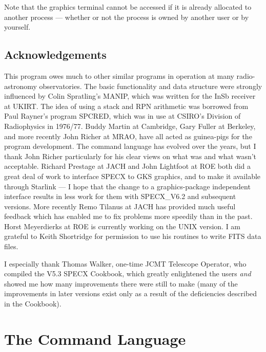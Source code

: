 \documentclass[11pt,twoside]{report}
\begin{document}
Note that the graphics terminal cannot be accessed if it is already allocated
to another process --- whether or not the process is owned by another user
or by yourself.

\section{Acknowledgements}

This program owes much to other similar programs in operation at many
radio-astronomy observatories. The basic functionality and data structure were
strongly influenced by Colin Spratling's
MANIP, which was written for the InSb
receiver at UKIRT. The idea of using a stack and RPN
arithmetic was borrowed from Paul Rayner's program SPCRED, which was in use at CSIRO's
Division of Radiophysics in 1976/77. Buddy Martin at
Cambridge, Gary Fuller at Berkeley, and more recently John
Richer at MRAO, have all  acted as guinea-pigs for the
program development. The command language has evolved over the years, but I
thank John Richer particularly for his clear views on what was and what wasn't
acceptable. Richard Prestage at JACH and John
Lightfoot at ROE both did a great deal of work to interface SPECX to GKS
graphics, and to make it available through
Starlink --- I hope that the change to a graphics-package
independent interface results in less work for them with SPECX\_V6.2 and
subsequent versions. More recently Remo Tilanus at JACH has provided much
useful feedback which has enabled me to fix problems more speedily than in the
past. Horst Meyerdierks at ROE is currently working on the UNIX version. I am
grateful to Keith Shortridge for permission to use his routines to write FITS
data files. 

I especially thank Thomas Walker, one-time JCMT Telescope
Operator, who compiled the V5.3 SPECX Cookbook, which
greatly enlightened the users {\em and} showed me how many improvements there
were still to make (many of the improvements in later versions exist only as a
result of the deficiencies described in the Cookbook). 

\chapter{The Command Language}
\end{document}
